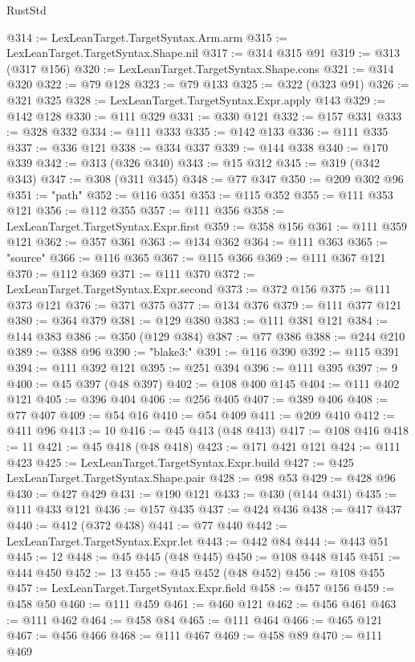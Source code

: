 \begin{lexlean}{RustStd}
\begin{coremodule}
@314 := LexLeanTarget.TargetSyntax.Arm.arm
@315 := LexLeanTarget.TargetSyntax.Shape.nil
@317 := @314 @315 @91
@319 := @313 (@317 @156)
@320 := LexLeanTarget.TargetSyntax.Shape.cons
@321 := @314 @320
@322 := @79 @128
@323 := @79 @133
@325 := @322 (@323 @91)
@326 := @321 @325
@328 := LexLeanTarget.TargetSyntax.Expr.apply @143
@329 := @142 @128
@330 := @111 @329
@331 := @330 @121
@332 := @157 @331
@333 := @328 @332
@334 := @111 @333
@335 := @142 @133
@336 := @111 @335
@337 := @336 @121
@338 := @334 @337
@339 := @144 @338
@340 := @170 @339
@342 := @313 (@326 @340)
@343 := @15 @312
@345 := @319 (@342 @343)
@347 := @308 (@311 @345)
@348 := @77 @347
@350 := @209 @302 @96
@351 := "path"
@352 := @116 @351
@353 := @115 @352
@355 := @111 @353 @121
@356 := @112 @355
@357 := @111 @356
@358 := LexLeanTarget.TargetSyntax.Expr.first
@359 := @358 @156
@361 := @111 @359 @121
@362 := @357 @361
@363 := @134 @362
@364 := @111 @363
@365 := "source"
@366 := @116 @365
@367 := @115 @366
@369 := @111 @367 @121
@370 := @112 @369
@371 := @111 @370
@372 := LexLeanTarget.TargetSyntax.Expr.second
@373 := @372 @156
@375 := @111 @373 @121
@376 := @371 @375
@377 := @134 @376
@379 := @111 @377 @121
@380 := @364 @379
@381 := @129 @380
@383 := @111 @381 @121
@384 := @144 @383
@386 := @350 (@129 @384)
@387 := @77 @386
@388 := @244 @210
@389 := @388 @96
@390 := "blake3:"
@391 := @116 @390
@392 := @115 @391
@394 := @111 @392 @121
@395 := @251 @394
@396 := @111 @395
@397 := 9
@400 := @45 @397 (@48 @397)
@402 := @108 @400 @145
@404 := @111 @402 @121
@405 := @396 @404
@406 := @256 @405
@407 := @389 @406
@408 := @77 @407
@409 := @54 @16
@410 := @54 @409
@411 := @209 @410
@412 := @411 @96
@413 := 10
@416 := @45 @413 (@48 @413)
@417 := @108 @416
@418 := 11
@421 := @45 @418 (@48 @418)
@423 := @171 @421 @121
@424 := @111 @423
@425 := LexLeanTarget.TargetSyntax.Expr.build
@427 := @425 LexLeanTarget.TargetSyntax.Shape.pair
@428 := @98 @53
@429 := @428 @96
@430 := @427 @429
@431 := @190 @121
@433 := @430 (@144 @431)
@435 := @111 @433 @121
@436 := @157 @435
@437 := @424 @436
@438 := @417 @437
@440 := @412 (@372 @438)
@441 := @77 @440
@442 := LexLeanTarget.TargetSyntax.Expr.let
@443 := @442 @84
@444 := @443 @51
@445 := 12
@448 := @45 @445 (@48 @445)
@450 := @108 @448 @145
@451 := @444 @450
@452 := 13
@455 := @45 @452 (@48 @452)
@456 := @108 @455
@457 := LexLeanTarget.TargetSyntax.Expr.field
@458 := @457 @156
@459 := @458 @50
@460 := @111 @459
@461 := @460 @121
@462 := @456 @461
@463 := @111 @462
@464 := @458 @84
@465 := @111 @464
@466 := @465 @121
@467 := @456 @466
@468 := @111 @467
@469 := @458 @89
@470 := @111 @469

\end{coremodule}
\end{lexlean}
